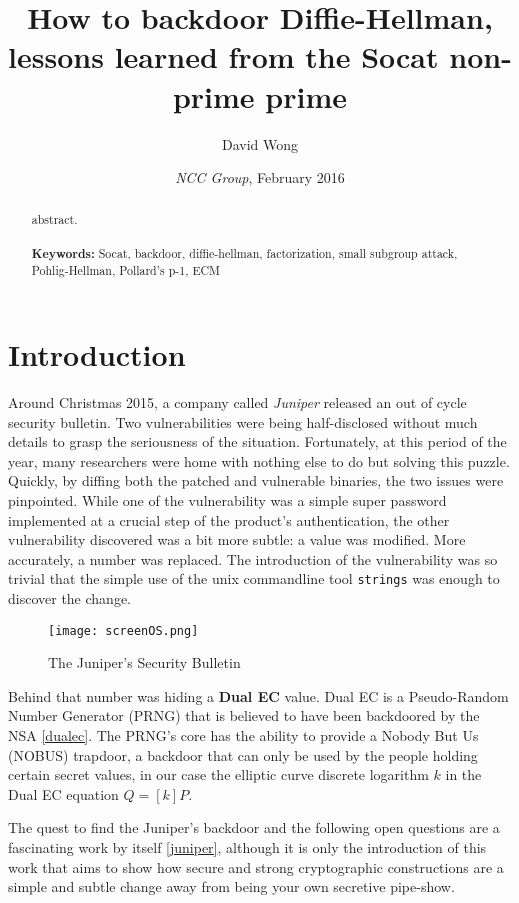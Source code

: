 \documentclass[a4paper,11pt]{article}
\title{How to backdoor Diffie-Hellman, lessons learned from the Socat non-prime prime}
\author{David Wong}
\date{\emph{NCC Group}, \small{February 2016}}
\begin{document}
\maketitle

\renewcommand{\abstractname}{Abstract}
\begin{abstract}
abstract.\\
\\
\textbf{Keywords:} Socat, backdoor, diffie-hellman, factorization, small subgroup attack, Pohlig-Hellman, Pollard's p-1, ECM\\

\end{abstract}

\section{Introduction}\label{introduction}

Around Christmas 2015, a company called \emph{Juniper} released an out of cycle security bulletin. Two vulnerabilities were being half-disclosed without much details to grasp the seriousness of the situation. Fortunately, at this period of the year, many researchers were home with nothing else to do but solving this puzzle. Quickly, by diffing both the patched and vulnerable binaries, the two issues were pinpointed. While one of the vulnerability was a simple super password implemented at a crucial step of the product's authentication, the other vulnerability discovered was a bit more subtle: a value was modified. More accurately, a number was replaced. The introduction of the vulnerability was so trivial that the simple use of the unix commandline tool \texttt{strings} was enough to discover the change.

\begin{figure}[H]
\centering
\texttt{[image: screenOS.png]}
\caption{The Juniper's Security Bulletin}\label{screenOS}
\end{figure}

Behind that number was hiding a \textbf{Dual EC} value. Dual EC is a Pseudo-Random Number Generator (PRNG) that is believed to have been backdoored by the NSA \ref{dualec}. The PRNG's core has the ability to provide a Nobody But Us (NOBUS) trapdoor, a backdoor that can only be used by the people holding certain secret values, in our case the elliptic curve discrete logarithm $k$ in the Dual EC equation $Q = [k]P$.

The quest to find the Juniper's backdoor and the following open questions are a fascinating work by itself \ref{juniper}, although it is only the introduction of this work that aims to show how secure and strong cryptographic constructions are a simple and subtle change away from being your own secretive pipe-show.
\end{document}
